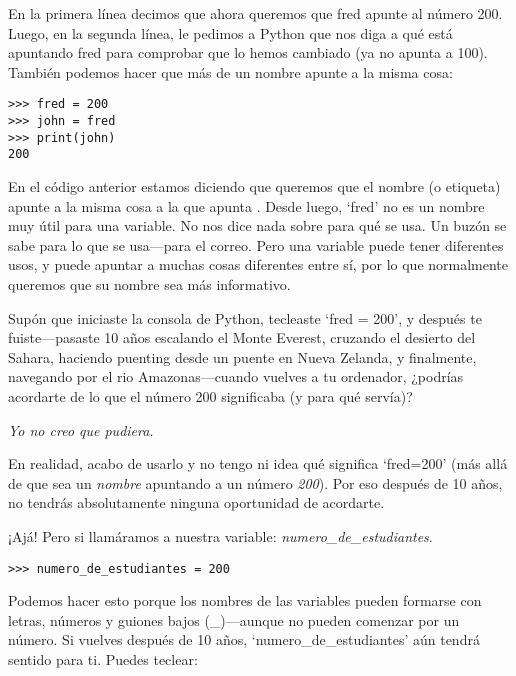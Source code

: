 \noindent
En la primera línea decimos que ahora queremos que fred apunte al número 200. Luego, en la segunda línea, le pedimos a Python que nos diga a qué está apuntando fred para comprobar que lo hemos cambiado (ya no apunta a 100). También podemos hacer que más de un nombre apunte a la misma cosa:

\begin{listing}
\begin{verbatim}
>>> fred = 200
>>> john = fred
>>> print(john)
200
\end{verbatim}
\end{listing}

En el código anterior estamos diciendo que queremos que el nombre (o etiqueta)  apunte a la misma cosa a la que apunta .
Desde luego, `fred' no es un nombre muy útil para una variable. No nos dice nada sobre para qué se usa. Un buzón se sabe para lo que se usa---para el correo. Pero una variable puede tener diferentes usos, y puede apuntar a muchas cosas diferentes entre sí, por lo que normalmente queremos que su nombre sea más informativo.
\par
Supón que iniciaste la consola de Python, tecleaste `fred = 200', y después te fuiste---pasaste 10 años escalando el Monte Everest, cruzando el desierto del Sahara, haciendo puenting desde un puente en Nueva Zelanda, y finalmente, navegando por el rio Amazonas---cuando vuelves a tu ordenador, ¿podrías acordarte de lo que el número 200 significaba (y para qué servía)?

\noindent
\emph{Yo no creo que pudiera.}

\noindent
En realidad, acabo de usarlo y no tengo ni idea qué significa `fred=200' (más allá de que sea un \emph{nombre} apuntando a un número \emph{200}).  Por eso después de 10 años, no tendrás absolutamente ninguna oportunidad de acordarte.
\par
¡Ajá! Pero si llamáramos a nuestra variable: \emph{numero\_de\_estudiantes}.

\begin{listing}
\begin{verbatim}
>>> numero_de_estudiantes = 200
\end{verbatim}
\end{listing}

Podemos hacer esto porque los nombres de las variables pueden formarse con letras, números y guiones bajos (\_)---aunque no pueden comenzar por un número.  Si vuelves después de 10 años, `numero\_de\_estudiantes' aún tendrá sentido para ti. Puedes teclear:

